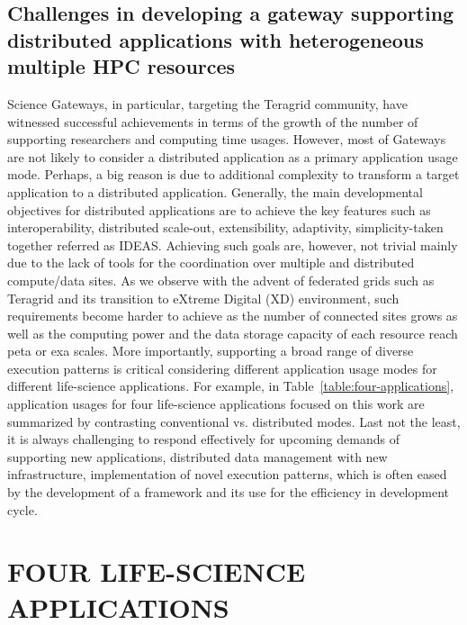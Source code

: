 \documentclass{sig-alternate}
\begin{document}
\subsection{Challenges in developing a gateway supporting distributed applications with heterogeneous multiple HPC resources}

Science Gateways, in particular, targeting the Teragrid community, have witnessed successful achievements in terms of the growth of the number of supporting researchers and computing time usages.  However, most of Gateways are not likely to consider a distributed application as a primary application usage mode.  Perhaps, a big reason is due to additional complexity to transform a target application to a distributed application.  Generally, the main developmental objectives for distributed applications are to achieve the key features such as interoperability, distributed scale-out, extensibility, adaptivity, simplicity-taken together referred as IDEAS\cite{ideas}.  Achieving such goals are, however, not trivial mainly due to the lack of tools for the coordination over multiple and distributed compute/data sites.  As we observe with the advent of federated grids such as Teragrid and its transition to eXtreme Digital (XD) environment, such requirements become harder to achieve as the number of connected sites grows as well as the computing power and the data storage capacity of each resource reach peta or exa scales.   More importantly, supporting a broad range of diverse execution patterns is critical considering different application usage modes for different life-science applications.  For example, in Table~\ref{table:four-applications}, application usages for four life-science applications focused on this work are summarized by contrasting conventional vs. distributed modes.  Last not the least, it is always challenging to respond effectively for upcoming demands of supporting new applications, distributed data management with new infrastructure, implementation of novel execution patterns, which is often eased by the development of a framework and its use for the efficiency in development cycle.   



\section{FOUR LIFE-SCIENCE APPLICATIONS}
\end{document}
